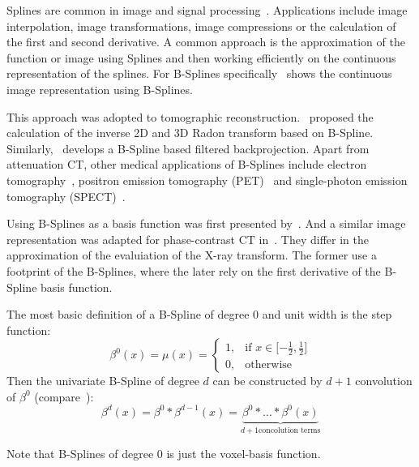 Splines are common in image and signal processing~\cite{unser_splines_1999}. Applications include
image interpolation, image transformations, image compressions or the calculation of the first and
second derivative. A common approach is the approximation of the function or image using Splines and
then working efficiently on the continuous representation of the splines. For B-Splines
specifically~\cite{unser_fast_1991} shows the continuous image representation using B-Splines.

This approach was adopted to tomographic reconstruction.~\cite{la_riviere_spline-based_1998}
proposed the calculation of the inverse 2D and 3D Radon transform based on B-Spline.
Similarly,~\cite{horbelt_discretization_2002} develops a B-Spline based filtered backprojection.
Apart from attenuation CT, other medical applications of B-Splines include electron
tomography~\cite{tran_robust_2013, tran_inverse_2014}, positron emission tomography
(PET)~\cite{nichols_spatiotemporal_2002, li_fast_2007, verhaeghe_investigation_2007} and
single-photon emission tomography (SPECT)~\cite{guedon_b-spline_1991, reutter_fully_2007}.

Using B-Splines as a basis function was first presented by~\cite{momey_new_2011,
	momey_b-spline_2012, momey_spline_2015}. And a similar image representation was adapted for
phase-contrast CT in~\cite{nilchian_fast_2013, nilchian_differential_2012, nilchian_spline_2015}.
They differ in the approximation of the evaluiation of the X-ray transform. The former use a
footprint of the B-Splines, where the later rely on the first derivative of the B-Spline basis
function.

\begin{definition}[B-Spline]
	The most basic definition of a B-Spline of degree \(0\) and unit width is the step function:
	\begin{equation}
		\beta^0(x) = \mu(x) =
		\begin{cases}
			1, & \text{if } x \in \mathopen[\minus \frac{1}{2}, \frac{1}{2}\mathclose] \\
			0, & \text{otherwise}
		\end{cases}
	\end{equation}
	Then the univariate B-Spline of degree \(d\) can be constructed by \(d + 1\) convolution of \(\beta^0\)
	(compare~\cite{momey_new_2011}):
	\begin{equation}
		\beta^d(x) = \beta^0 * \beta^{d-1}(x) =
		\underbrace{\beta^0 * \dots * \beta^0(x)}_{d+1 \text{concolution terms}}
	\end{equation}
\end{definition}
Note that B-Splines of degree \(0\) is just the voxel-basis function.

